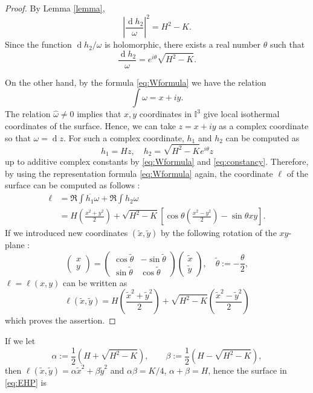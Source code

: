 \documentclass[12pt,a4paper,reqno]{amsart}
\theoremstyle{plain} %
\theoremstyle{definition}
\begin{document}
\begin{proof}
By Lemma \ref{lemma}, 
	\[
		\left|\frac{\operatorname{d}\!h_2}{\omega} \right|^2 = H^2-K.
	\]
Since the function $\operatorname{d}\!h_2/\omega $ is holomorphic, there exists a real number $\theta$ such that 
	\begin{equation}\label{eq:constancy}
	\frac{\operatorname{d}\!h_2}{\omega} =e^{i\theta}\sqrt{H^2-K}.
	\end{equation}

On the other hand, by the formula \eqref{eq:Wformula} we have the relation
	\[
		\int{\omega} = x+iy.
	\]
The relation $\hat{\omega}\neq 0$ implies that $x,y$ coordinates in $\mathbb{I}^3$ give local isothermal coordinates of the surface. Hence, we can take $z=x+iy$ as a complex coordinate so that $\omega=\operatorname{d}\!z$. 
For such a complex coordinate, $h_1$ and $h_2$ can be computed as
	\[
		h_1=Hz,\quad h_2=\sqrt{H^2-K}e^{i\theta}z
	\]
up to additive complex constants by \eqref{eq:Wformula} and \eqref{eq:constancy}.
Therefore, by using the representation formula \eqref{eq:Wformula} again, the coordinate $\ell$ of the surface can be computed as follows :
\begin{align*}
\ell &= \Re{\int{\overline{h_1}\omega}} + \Re{\int{h_2\omega}} \\ 
&=H\left(\frac{x^2+y^2}{2} \right) +\sqrt{H^2-K}\left[ \cos{\theta}\left(\frac{x^2-y^2}{2}\right)-\sin{\theta} xy\right].
\end{align*}
If we introduced new coordinates $(\tilde{x},\tilde{y})$ by the following rotation of the $xy$-plane :
	\[
		\begin{pmatrix} x \\ y \end{pmatrix} = \begin{pmatrix} \cos{\tilde{\theta}}  & -\sin{\tilde{\theta}} \\ \sin{\tilde{\theta}} & \cos{\tilde{\theta}} \end{pmatrix}
\begin{pmatrix} \tilde{x} \\ \tilde{y} \end{pmatrix}, \quad \tilde{\theta}:=-\frac{\theta}{2},
	\]
$\ell=\ell(x,y)$ can be written as
	\[
		\ell(\tilde{x},\tilde{y})=H\left(\frac{\tilde{x}^2+\tilde{y}^2}{2}\right)+\sqrt{H^2-K}\left(\frac{\tilde{x}^2-\tilde{y}^2}{2}\right)
	\]
which proves the assertion.
\end{proof}

If we let 
	\[
		\alpha := \frac{1}{2} \left( H + \sqrt{H^2-K}\right),	\qquad \beta := \frac{1}{2} \left( H - \sqrt{H^2-K}\right),
	\]
then $\ell(\tilde{x},\tilde{y}) = \alpha \tilde{x}^2 + \beta \tilde{y}^2$ and $\alpha\beta =K/4$, $\alpha + \beta = H$, hence the surface in \eqref{eq:EHP} is 
\end{document}

